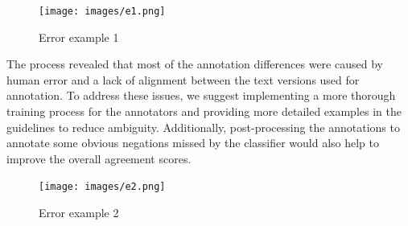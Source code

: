 \begin{figure}[!h]
  \texttt{[image: images/e1.png]}
  \caption{Error example 1}
  \label{fig:error2}
\end{figure}


The process revealed that most of the annotation differences were caused by human error and a lack of alignment between the text versions used for annotation. To address these issues, we suggest implementing a more thorough training process for the annotators and providing more detailed examples in the guidelines to reduce ambiguity. Additionally, post-processing the annotations to annotate some obvious negations missed by the classifier would also help to improve the overall agreement scores.

\begin{figure}[!h]
  \texttt{[image: images/e2.png]}
  \caption{Error example 2} 
  \label{fig:error3}
\end{figure}



